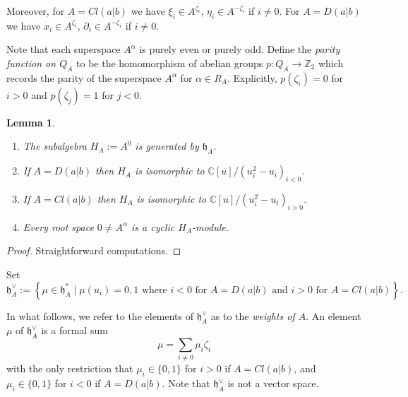 \documentclass[12pt]{amsart}
\theoremstyle{plain} %
\numberwithin{equation}{section}
\theoremstyle{definition}
\theoremstyle{remark}
\theoremstyle{plain} %
\newtheorem{lemma}[definition]{Lemma}
\newcommand{\gh}{\mathfrak{h}}
\def\gh{\mathfrak{h}}
\begin{document}
    
      
     Moreover, for  $A = Cl(a|b)$ we have $\xi_i \in A^{\zeta_i}$, $\eta_i \in A^{-\zeta_i}$ if $i \neq 0$. For $A = D(a|b)$ we have  $x_i \in A^{\zeta_{i}}$, $\partial_i \in A^{-\zeta_{i}}$ if $i\neq 0$.

   Note that each superspace $A^\alpha$  is purely even or purely odd.  Define the \emph{parity function on $Q_A$} to be the homomorphism of abelian groups $p:Q_A\to\mathbb Z_2 $ which records the parity of the superspace $A^\alpha$ for $\alpha \in R_{A}$. 
Explicitly, 
      $p(\zeta_i)=0$ for $i>0$ and $p(\zeta_j)=1$ for  $j<0$.
   
   

     
      \begin{lemma}\label{rootsA} \begin{enumerate}
        \item[(a)]  The subalgebra $H_A:=A^0$ is generated by $\gh_A$.
        \item[(b)] If $A=D(a|b)$ then $H_A$ is isomorphic to $\mathbb C[u]/(u_i^2-u_i)_{i<0}$.
        \item[(c)]  If $A=Cl(a|b)$ then $H_A$ is isomorphic to $\mathbb C[u]/(u_i^2-u_i)_{i > 0}$.
          \item[(d)] Every  root space $0\neq A^{\alpha}$ is a cyclic $H_A$-module.
          \end{enumerate}
        \end{lemma}
        \begin{proof} Straightforward computations.
        \end{proof}

Set
$$
\gh^{\vee}_A:= \left\{\mu\in\gh_A^*\mid\mu(u_i)=0,1 \mbox{ where } i<0   \mbox{ for  }A=D(a|b)  \mbox{ and } i>0  \mbox{ for }A=Cl(a|b)\right\}.
      $$
      
      
              
In what follows, we refer to the elements of $\gh^{\vee}_A$ as to the \emph{weights of $A$}. An element $\mu$ of $\gh^{\vee}_A$ is a formal sum
$$\mu =  \sum_{i\neq 0}\mu_i \zeta_i $$
 with the only restriction that $\mu_i\in \{0,1 \}$ for  $i>0$ if $A = Cl(a|b)$,  and  $\mu_i\in \{0,1 \}$ for $i<0$ if $A = D(a|b)$.  Note that  $\gh^{\vee}_A$ is not a vector space.
\end{document}
